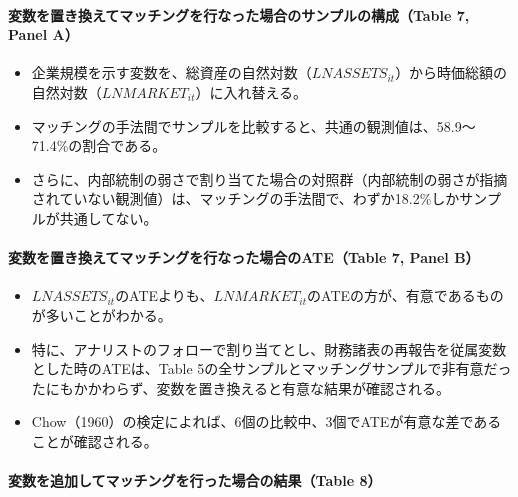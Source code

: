 \paragraph{変数を置き換えてマッチングを行なった場合のサンプルの構成（Table 7, Panel A）}

\begin{itemize}
 \item 企業規模を示す変数を、総資産の自然対数（$\mathit{LNASSETS}_{it}$）から時価総額の自然対数（$\mathit{LNMARKET}_{it}$）に入れ替える。
 \item マッチングの手法間でサンプルを比較すると、共通の観測値は、58.9〜71.4\%の割合である。
 \item さらに、内部統制の弱さで割り当てた場合の対照群（内部統制の弱さが指摘されていない観測値）は、マッチングの手法間で、わずか18.2\%しかサンプルが共通してない。
\end{itemize}

\paragraph{変数を置き換えてマッチングを行なった場合のATE（Table 7, Panel B）}

\begin{itemize}
 \item $\mathit{LNASSETS}_{it}$のATEよりも、$\mathit{LNMARKET}_{it}$のATEの方が、有意であるものが多いことがわかる。
 \item 特に、アナリストのフォローで割り当てとし、財務諸表の再報告を従属変数とした時のATEは、Table 5の全サンプルとマッチングサンプルで非有意だったにもかかわらず、変数を置き換えると有意な結果が確認される。
 \item Chow（1960）の検定によれば、6個の比較中、3個でATEが有意な差であることが確認される。
\end{itemize}

\paragraph{変数を追加してマッチングを行った場合の結果（Table 8）}

